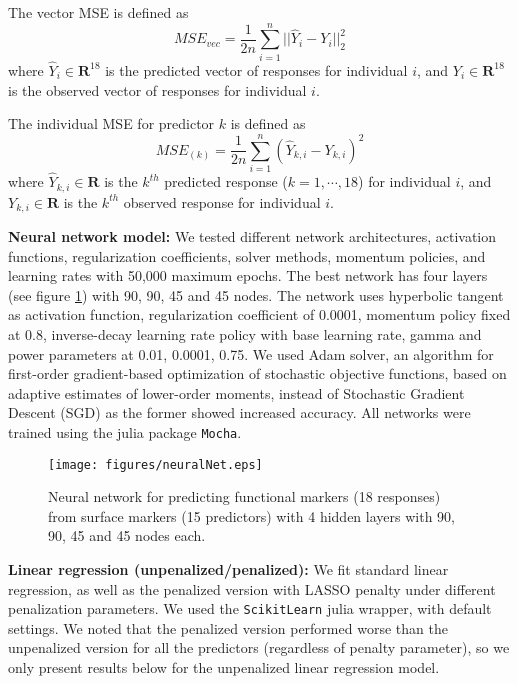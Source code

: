 \documentclass[graybox]{svmult}
\begin{document}
The vector MSE is defined as
\begin{equation}
MSE_{vec} = \frac{1}{2n} \sum_{i=1}^n ||\hat{Y}_i - Y_i ||^2_2
\label{vectorMSEformula}
\end{equation}
where $\hat{Y}_i \in \mathbf{R}^{18}$ is the predicted vector of
responses for individual $i$, and $Y_i \in \mathbf{R}^{18}$ is the
observed vector of responses for individual $i$.

The individual MSE for predictor $k$ is defined  as
\begin{equation}
MSE_{(k)} = \frac{1}{2n} \sum_{i=1}^n (\hat{Y}_{k,i} - Y_{k,i} )^2
\label{MSEformula}
\end{equation}
where $\hat{Y}_{k,i} \in \mathbf{R}$ is the $k^{th}$ predicted
response ($k=1,\cdots,18$) for individual $i$, and $Y_{k,i} \in
\mathbf{R}$ is the $k^{th}$ observed response for individual $i$.

\vspace{0.25cm}
\noindent \textbf{Neural network model:} We tested different network
architectures, activation functions, regularization coefficients,
solver methods, momentum policies, and learning rates with 50,000
maximum epochs. The best network has four layers (see figure \ref{nn})
with 90, 90, 45 and 45 nodes. The network uses hyperbolic tangent as
activation function, regularization coefficient of 0.0001, momentum
policy fixed at 0.8, inverse-decay learning rate policy with base
learning rate, gamma and power parameters at 0.01, 0.0001, 0.75. We
used Adam solver\cite{Kingma2014}, an algorithm for first-order
gradient-based optimization of stochastic objective functions, based
on adaptive estimates of lower-order moments, instead of Stochastic
Gradient Descent (SGD) as the former showed increased accuracy. All
networks were trained using the julia package
\texttt{Mocha}\cite{Bezanson2017,mocha}.

\begin{figure}
\centering
\texttt{[image: figures/neuralNet.eps]}
\caption{Neural network for predicting functional markers (18
  responses) from surface markers (15 predictors) with 4 hidden
  layers with 90, 90, 45 and 45 nodes each.}
\label{nn}
\end{figure}

\vspace{0.25cm}
\noindent \textbf{Linear regression (unpenalized/penalized):} We fit
standard linear regression, as well as the penalized version with
LASSO penalty under different penalization parameters. We used the
\texttt{ScikitLearn}\cite{scikit} julia wrapper, with default
settings. We noted that the penalized version performed worse than the
unpenalized version for all the predictors (regardless of penalty
parameter), so we only present results below for the unpenalized
linear regression model.
\end{document}
